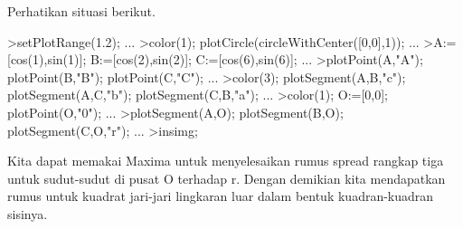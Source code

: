 \documentclass[a4paper,10pt]{article}
\begin{document}
\begin{eulernotebook}
\begin{eulercomment}
\begin{eulercomment}
\begin{eulercomment}
\begin{eulercomment}
\begin{eulercomment}
\begin{eulercomment}
\begin{eulercomment}
\begin{eulercomment}
\begin{eulercomment}
\begin{eulercomment}
\begin{eulercomment}
\begin{eulercomment}
\begin{eulercomment}
\end{eulercomment}
\begin{eulercomment}
Perhatikan situasi berikut.
\end{eulercomment}
\begin{eulerprompt}
>setPlotRange(1.2); ...
>color(1); plotCircle(circleWithCenter([0,0],1)); ...
>A:=[cos(1),sin(1)]; B:=[cos(2),sin(2)]; C:=[cos(6),sin(6)]; ...
>plotPoint(A,"A"); plotPoint(B,"B"); plotPoint(C,"C"); ...
>color(3); plotSegment(A,B,"c"); plotSegment(A,C,"b"); plotSegment(C,B,"a"); ...
>color(1); O:=[0,0];  plotPoint(O,"0"); ...
>plotSegment(A,O); plotSegment(B,O); plotSegment(C,O,"r"); ...
>insimg;
\end{eulerprompt}
\begin{eulercomment}
Kita dapat memakai Maxima untuk menyelesaikan rumus spread rangkap tiga untuk sudut-sudut di
pusat O terhadap r. Dengan demikian kita mendapatkan rumus untuk kuadrat jari-jari
lingkaran luar dalam bentuk kuadran-kuadran sisinya.


\end{eulercomment}
\end{eulercomment}
\end{eulercomment}
\end{eulercomment}
\end{eulercomment}
\end{eulercomment}
\end{eulercomment}
\end{eulercomment}
\end{eulercomment}
\end{eulercomment}
\end{eulercomment}
\end{eulercomment}
\end{eulercomment}
\end{eulernotebook}
\end{document}
